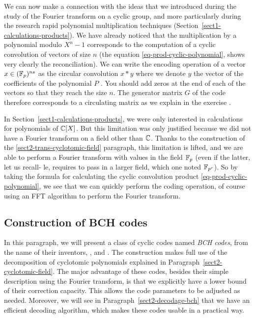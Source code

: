  
  We can now make a connection with the ideas that we introduced during the study of the Fourier transform on a cyclic group, and more particularly during the research rapid polynomial multiplication techniques (Section~\ref{sect1-calculations-products}). We have already noticed that the multiplication by a polynomial modulo $ X^n-1 $ corresponds to the computation of a cyclic convolution of vectors of size $ n $ (the equation \eqref{eq-prod-cyclic-polynomial}, shows very clearly the reconciliation). We can write the encoding operation of a vector $ x \in (\mathbb{F}_p)^{ns} $ as the circular convolution $ x * y $ where we denote $ y $ the vector of the coefficients of the polynomial $ P $ . You should add zeros at the end of each of the vectors so that they reach the size $ n $. The generator matrix $ G $ of the code therefore corresponds to a circulating matrix as we explain in the exercise .
 
 
In Section~\ref{sect1-calculations-products}, we were only interested in calculations for polynomials of $ \mathbb{C} [X] $. But this limitation was only justified because we did not have a Fourier transform on a field other than $ \mathbb{C} $. Thanks to the construction of the \ref{sect2-trans-cyclotomic-field} paragraph, this limitation is lifted, and we are able to perform a Fourier transform with values in the field $ \mathbb{F}_p $ (even if the latter, let us recall- le, requires to pass in a larger field, which one noted $ \mathbb{F}_{p^r} $). So by taking the formula for calculating the cyclic convolution product \eqref{eq-prod-cyclic-polynomial}, we see that we can quickly perform the coding operation, of course using an FFT algorithm to perform the Fourier transform.

\subsection{Construction of BCH codes}
\label{sect2-codes-BCH}
 
 
  In this paragraph, we will present a class of cyclic codes named \textit{BCH codes}, from the name of their inventors, ,  and . The construction makes full use of the decomposition of cyclotomic polynomials explained in Paragraph~\ref{sect2-cyclotomic-field}. The major advantage of these codes, besides their simple description using the Fourier transform, is that we explicitly have a lower bound of their correction capacity. This allows the code parameters to be adjusted as needed. Moreover, we will see in Paragraph~\ref{sect2-decodage-bch} that we have an efficient decoding algorithm, which makes these codes usable in a practical way.
 

